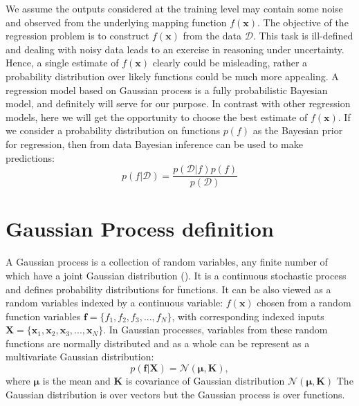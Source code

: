 We assume the outputs considered at the training level may contain some noise and observed from the underlying mapping function $f(\textbf{x})$. The objective of the regression problem is to construct $f(\textbf{x})$ from the data $\mathcal{D}$. This task is ill-defined and dealing with noisy data leads to an exercise in reasoning under uncertainty. Hence, a single estimate of $f(\textbf{x})$ clearly could be misleading, rather a probability distribution over likely functions could be much more appealing. A regression model based on Gaussian process is a fully probabilistic Bayesian model, and definitely will serve for our purpose. In contrast with other regression models, here we will get the opportunity to choose the best estimate of $f(\textbf{x})$. If we consider a probability distribution on functions $p(f)$ as the Bayesian prior for regression, then from data Bayesian inference can be used to make predictions:
\begin{equation} \label{eq:2.1}
p(f|\mathcal{D})= \frac{p(\mathcal{D}|f)p(f)}{p(\mathcal{D})} 
\end{equation}


\section{Gaussian Process definition}
A Gaussian process is a collection of random variables, any finite number of which have a joint Gaussian distribution (\cite{Rasmussen_and_Williams:2006}). It is a continuous stochastic process and defines probability distributions for functions. It can be also viewed as a random variables indexed by a continuous variable: $ f(\textbf{x})$ chosen from a random function variables $ \textbf{f} = \{ f_1, f_2, f_3,..., f_N\}$, with corresponding indexed inputs $ \textbf{X} = \{ \textbf{x}_1, \textbf{x}_2, \textbf{x}_3,..., \textbf{x}_N\}$. In Gaussian processes, variables from these random functions are normally distributed and as a whole can be represent as a multivariate Gaussian distribution:
\begin{equation} \label{eq:2.2}
p(\textbf{f}|\textbf{X})= \mathcal{N}(\boldsymbol\mu,\textbf{K}),
\end{equation}
where $\boldsymbol\mu$ is the mean and $\textbf{K}$ is covariance of Gaussian distribution $\mathcal{N}(\boldsymbol\mu,\textbf{K})$ The Gaussian distribution is over vectors but the Gaussian process is over functions.

